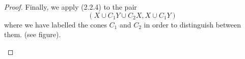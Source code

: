 \documentclass[leqno]{book}
\numberwithin{equation}{section}
\theoremstyle{definition}
\begin{document}
\begin{proof}
              Finally, we apply (2.2.4) to the pair
              \begin{equation*}
                (X\cup C_1 Y\cup C_2 X,X\cup C_1 Y)
              \end{equation*}
              where we have labelled the cones $C_1$ and $C_2$ in order to distinguish between them. (see figure).


              \begin{figure}[htbp]
                \centering
\end{figure}
\end{proof}
\end{document}

